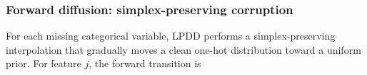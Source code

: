 \documentclass[times, review, 10pt]{elsarticle}
\newcommand{\DIFaddbegin}{\begingroup\color{blue}}
\newcommand{\DIFaddend}{\endgroup}
\begin{document}


\DIFaddbegin
\DIFaddend








\subsubsection{Forward diffusion: simplex-preserving corruption}

For each missing categorical variable, LPDD performs a simplex-preserving
interpolation that gradually moves a clean one-hot distribution toward a
uniform prior. For feature $j$, the forward transition is
\end{document}

